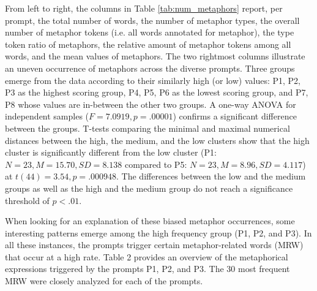 \documentclass[11pt,a4paper]{article}
\begin{document}
From left to right, the columns in Table \ref{tab:num_metaphors} report, per prompt, the total number of words, the number of metaphor types, the overall number of metaphor tokens (i.e. all words annotated for metaphor), the type token ratio of metaphors, the relative amount of metaphor tokens among all words, and the mean values of metaphors. The two rightmost columns illustrate an uneven occurrence of metaphors across the diverse prompts. Three groups emerge from the data according to their similarly high (or low) values: P1, P2, P3 as the highest scoring group, P4, P5, P6 as the lowest scoring group, and P7, P8 whose values are in-between the other two groups. A one-way ANOVA for independent samples ($F=7.0919, p=.00001$) confirms a significant difference between the groups. T-tests comparing the minimal and maximal numerical distances between the high, the medium, and the low clusters show that the high cluster is significantly different from the low cluster (P1: $N=23, M=15.70, SD=8.138$ compared to P5: $N=23, M=8.96, SD=4.117$) at $t(44)=3.54, p=.000948$. The differences between the low and the medium groups as well as the high and the medium group do not reach a significance threshold of $p<.01$.  

When looking for an explanation of these biased metaphor occurrences, some interesting patterns emerge among the high frequency group (P1, P2, and P3). In all these instances, the prompts trigger certain metaphor-related words (MRW) that occur at a high rate. Table 2 provides an overview of the metaphorical expressions triggered by the prompts P1, P2, and P3. The 30 most frequent MRW were closely analyzed for each of the prompts. 
\end{document}
